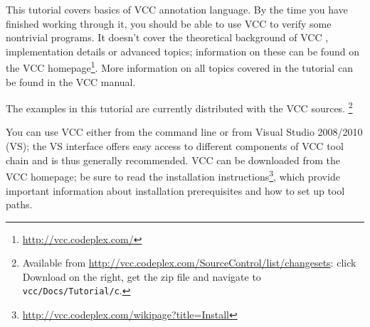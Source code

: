 This tutorial covers basics of VCC annotation language. By the time
you have finished working through it, you should be able to use VCC to
verify some nontrivial programs. It doesn't cover the theoretical
background of VCC \cite{lci}, implementation details \cite{vcc}
or advanced topics;
information on these can be found on the VCC
homepage\footnote{\url{http://vcc.codeplex.com/}}.
More information on all topics covered in the tutorial can be found in the
VCC manual.

The examples in this tutorial are currently distributed with the VCC sources.%
\footnote{
Available from \url{http://vcc.codeplex.com/SourceControl/list/changesets}: click Download on the right,
get the zip file and navigate to \lstinline|vcc/Docs/Tutorial/c|.}

You can use VCC either from the command line or from Visual Studio
2008/2010 (VS); the VS interface offers easy access to different components of
VCC tool chain and is thus generally recommended.
VCC can be downloaded from the VCC homepage; 
be sure to read the installation instructions\footnote{\url{http://vcc.codeplex.com/wikipage?title=Install}},
which provide important information about installation prerequisites 
and how to set up tool paths.

